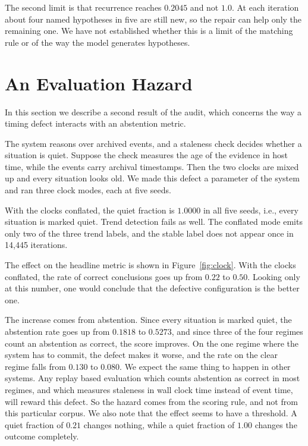 \documentclass[conference]{IEEEtran}
\begin{document}
The second limit is that recurrence reaches $0.2045$ and not $1.0$. At each
iteration about four named hypotheses in five are still new, so the repair can
help only the remaining one. We have not established whether this is a limit
of the matching rule or of the way the model generates hypotheses.

\section{An Evaluation Hazard}
\label{sec:hazards}

In this section we describe a second result of the audit, which concerns the
way a timing defect interacts with an abstention metric.

The system reasons over archived events, and a staleness check decides
whether a situation is quiet. Suppose the check measures the age of the
evidence in host time, while the events carry archival timestamps. Then the
two clocks are mixed up and every situation looks old. We made this defect a
parameter of the system and ran three clock modes, each at five seeds.

With the clocks conflated, the quiet fraction is $1.0000$ in all five seeds,
i.e., every situation is marked quiet. Trend detection fails as well. The
conflated mode emits only two of the three trend labels, and the stable label
does not appear once in 14{,}445 iterations.

The effect on the headline metric is shown in Figure~\ref{fig:clock}. With the
clocks conflated, the rate of correct conclusions goes up from $0.22$ to
$0.50$. Looking only at this number, one would conclude that the defective
configuration is the better one.

The increase comes from abstention. Since every situation is marked quiet, the
abstention rate goes up from $0.1818$ to $0.5273$, and since three of the four
regimes count an abstention as correct, the score improves. On the one regime
where the system has to commit, the defect makes it worse, and the rate on the
clear regime falls from $0.130$ to $0.080$. We expect the same thing to happen
in other systems. Any replay based evaluation which counts abstention as
correct in most regimes, and which measures staleness in wall clock time
instead of event time, will reward this defect. So the hazard comes from the
scoring rule, and not from this particular corpus. We also note that the
effect seems to have a threshold. A quiet fraction of $0.21$ changes nothing,
while a quiet fraction of $1.00$ changes the outcome completely.
\end{document}
